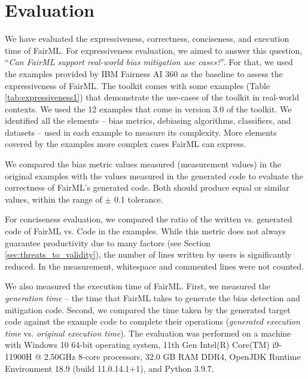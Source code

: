 \documentclass[sigconf,review]{acmart}
\begin{document}
{	\section{Evaluation}
	\label{sec:evaluation}
	We have evaluated the expressiveness, correctness, conciseness, and execution time of FairML. For expressiveness evaluation, we aimed to answer this question, 
	``\textit{Can FairML support real-world bias mitigation use cases?}''. For that, we used the examples provided by IBM Fairness AI 360 as the baseline to assess the expressiveness of FairML. 
	The toolkit comes with some examples (Table \ref{tab:expressiveness1})
	that demonstrate 
	the use-cases of the toolkit in real-world contexts. 
	We used the 12 examples that come in version 3.0 of the toolkit.
	We identified all the elements -- bias metrics, debiasing algorithms, classifiers, and datasets -- used in each example to measure its complexity. More elements covered by the examples more complex cases FairML can express.
	
	We compared the bias metric values measured (measurement values) in the original examples with the values measured in the generated code to evaluate the correctness of FairML's generated code. Both should produce equal or similar values, within the range of $\pm$ 0.1 tolerance.
	
	For conciseness evaluation, 
	we compared the ratio of the written vs. generated code of FairML vs.
	Code in the examples. 
	While this metric does not always guarantee productivity due to many factors (see Section \ref{sec:threats_to_validity}), 
	the number of lines written by users is significantly reduced. In the measurement, whitespace and commented lines were not counted.
	
	We also measured the execution time of FairML. First, we measured the \textit{generation time} -- the time that FairML takes to generate the bias detection and mitigation code. Second, we compared the time taken by the generated target code against the example code to complete their operations (\textit{generated execution time} vs. \textit{original execution time}). The evaluation was performed on a machine with Windows 10 64-bit operating system, 11th Gen Intel(R) Core(TM) i9-11900H @ 2.50GHz 8-core processors, 32.0 GB RAM DDR4, OpenJDK Runtime Environment 18.9 (build 11.0.14.1+1), and Python 3.9.7.
	
}
\end{document}
